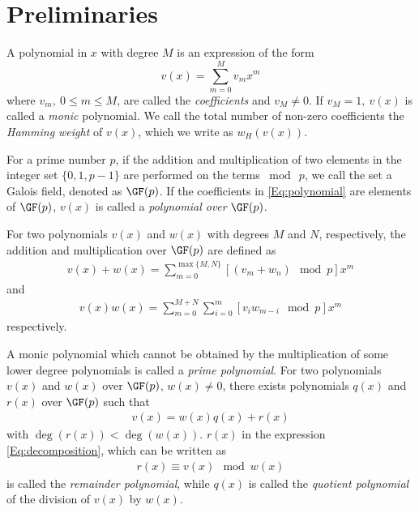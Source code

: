 \section{Preliminaries}
\label{secPrelim}

A polynomial in $x$ with degree $M$ is an expression of the form
\begin{equation}
v(x) = \sum_{m=0}^{M} v_mx^m
\label{Eq:polynomial}
\end{equation}
where $v_m,~0 \leq m \leq M$, are called the \textit{coefficients} and $v_M \neq 0$. If $v_M=1,~v(x)$ is called a \textit{monic} polynomial. We call the total number of non-zero coefficients the \textit{Hamming weight} of $v(x)$, which we write as $w_H(v(x))$.

For a prime number $p$, if the addition and multiplication of two elements in the integer set $\{ 0,1,p-1\}$ are performed on the terms $\bmod~p$, we call the set a Galois field, denoted as $\GF(p)$. If the coefficients in \eqref{Eq:polynomial} are elements of $\GF(p)$, $v(x)$ is called a {\it polynomial over} $\GF(p)$.


For two polynomials $v(x)$ and $w(x)$ with degrees $M$ and $N$, respectively, the addition and multiplication over $\GF(p)$ are defined as 
\begin{align}
v(x)+w(x)=\sum_{m=0}^{\max\{ M,N\}} [(v_m +w_n)\mod p] x^m
\label{Eq:addition}
\end{align}
and
\begin{align}
v(x)w(x)=\sum_{m=0}^{ M+N} \sum_{i=0}^{m} [v_i w_{m-i}\mod p]x^m
\label{Eq:multiplication}
\end{align}
respectively. 

A monic polynomial which cannot be obtained by the multiplication of some lower degree polynomials is called a \textit{prime polynomial}.
For two polynomials $v(x)$ and $w(x)$ over $\GF(p)$, $w(x) \neq 0$, there exists polynomials $q(x)$ and $r(x)$ 
over $\GF(p)$ such that 
\begin{align}
v(x) = w(x)q(x)+r(x)
\label{Eq:decomposition}
\end{align}
with $\deg(r(x)) < \deg(w(x))$. $r(x)$ in the expression \eqref{Eq:decomposition}, which can be written as
\begin{align}
r(x) \equiv v(x)\mod w(x)
\end{align}
is called the \textit{remainder polynomial}, while $q(x)$ is called the \textit{quotient polynomial} of the division of $v(x)$ by $w(x)$.

